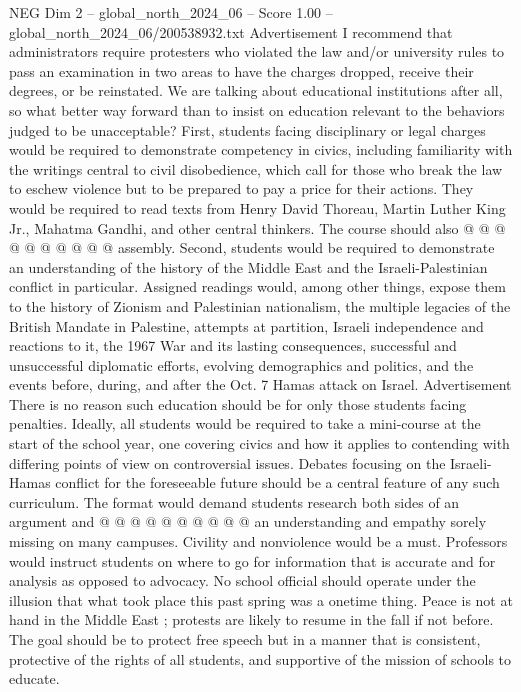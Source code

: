\begin{textsample}{NEG Dim 2 – global\_north\_2024\_06 – Score 1.00 – global\_north\_2024\_06/200538932.txt}
Advertisement I recommend that administrators require protesters who violated the law and/or university rules to pass an examination in two areas to have the charges dropped, receive their degrees, or be reinstated.
We are talking about educational institutions after all, so what better way forward than to insist on education relevant to the behaviors judged to be unacceptable?
First, students facing disciplinary or legal charges would be required to demonstrate competency in civics, including familiarity with the writings central to civil disobedience, which call for those who break the law to eschew violence but to be prepared to pay a price for their actions.
They would be required to read texts from Henry David Thoreau, Martin Luther King Jr., Mahatma Gandhi, and other central thinkers.
The course should also @ @ @ @ @ @ @ @ @ @ assembly.
Second, students would be required to demonstrate an understanding of the history of the Middle East and the Israeli-Palestinian conflict in particular.
Assigned readings would, among other things, expose them to the history of Zionism and Palestinian nationalism, the multiple legacies of the British Mandate in Palestine, attempts at partition, Israeli independence and reactions to it, the 1967 War and its lasting consequences, successful and unsuccessful diplomatic efforts, evolving demographics and politics, and the events before, during, and after the Oct. 7 Hamas attack on Israel.
Advertisement There is no reason such education should be for only those students facing penalties.
Ideally, all students would be required to take a mini-course at the start of the school year, one covering civics and how it applies to contending with differing points of view on controversial issues.
Debates focusing on the Israeli-Hamas conflict for the foreseeable future should be a central feature of any such curriculum.
The format would demand students research both sides of an argument and @ @ @ @ @ @ @ @ @ @ an understanding and empathy sorely missing on many campuses.
Civility and nonviolence would be a must.
Professors would instruct students on where to go for information that is accurate and for analysis as opposed to advocacy.
No school official should operate under the illusion that what took place this past spring was a onetime thing.
Peace is not at hand in the Middle East ; protests are likely to resume in the fall if not before.
The goal should be to protect free speech but in a manner that is consistent, protective of the rights of all students, and supportive of the mission of schools to educate.

\end{textsample}
